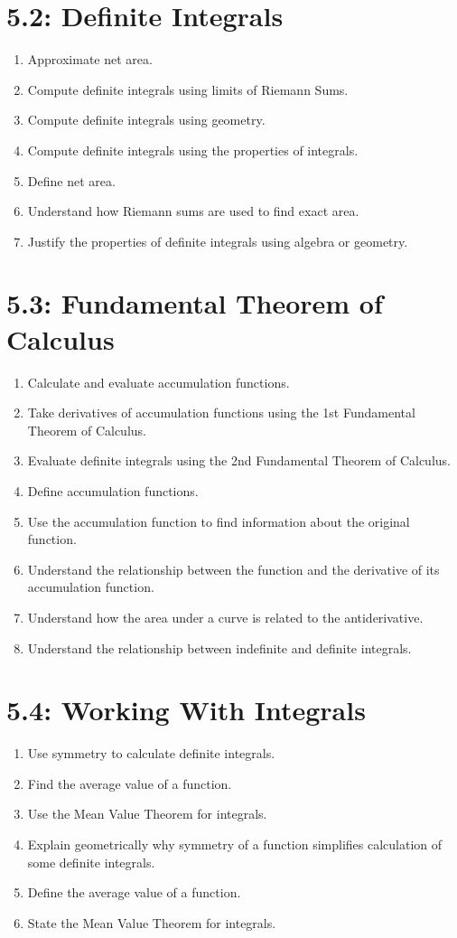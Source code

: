 \section*{5.2: Definite Integrals}
\begin{enumerate}
	\item Approximate net area.
	\item Compute definite integrals using limits of Riemann Sums.
	\item Compute definite integrals using geometry.
	\item Compute definite integrals using the properties of integrals.
	\item Define net area.
	\item Understand how Riemann sums are used to find exact area.
	\item Justify the properties of definite integrals using algebra or geometry.
\end{enumerate}

\section*{5.3: Fundamental Theorem of Calculus}
\begin{enumerate}
	\item Calculate and evaluate accumulation functions.
	\item Take derivatives of accumulation functions using the 1st Fundamental Theorem of Calculus.
	\item Evaluate definite integrals using the 2nd Fundamental Theorem of Calculus.
	\item Define accumulation functions.
	\item Use the accumulation function to find information about the original function.
	\item Understand the relationship between the function and the derivative of its accumulation function.
	\item Understand how the area under a curve is related to the antiderivative.
	\item Understand the relationship between indefinite and definite integrals.
\end{enumerate}

\section*{5.4: Working With Integrals}
\begin{enumerate}
	\item Use symmetry to calculate definite integrals.
	\item Find the average value of a function.
	\item Use the Mean Value Theorem for integrals.
	\item Explain geometrically why symmetry of a function simplifies calculation of some definite integrals.
	\item Define the average value of a function.
	\item State the Mean Value Theorem for integrals.
\end{enumerate}

